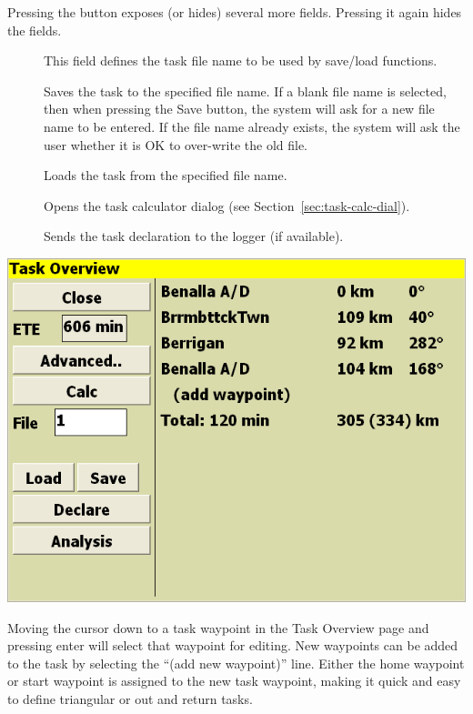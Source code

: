 \documentclass[a4paper,12pt]{refrep}
\begin{document}
Pressing the  button exposes (or hides) several more
fields.  Pressing it again hides the fields.
\begin{description}
\item[] This field defines the task file name to be used by save/load functions.  
\item[] Saves the task to the specified file name.  If a blank file name is selected, then when pressing the Save button, the system will ask for a new file name to be entered.  If the file name already exists, the system will ask the user whether it is OK to over-write the old file.
\item[] Loads the task from the specified file name.
\item[] Opens the task calculator dialog (see Section~\ref{sec:task-calc-dial}).
\item[] Sends the task declaration to the logger (if available).
\end{description} 

\begin{center}
\includegraphics[angle=0,width=\linewidth,keepaspectratio='true']{figures/dialog-taskedit2.png}
\end{center}


Moving the cursor down to a task waypoint in the Task Overview page
and pressing enter will select that waypoint for editing.  New
waypoints can be added to the task by selecting the ``(add new
waypoint)'' line.  Either the home waypoint or start waypoint is
assigned to the new task waypoint, making it quick and easy to define
triangular or out and return tasks.
\end{document}
